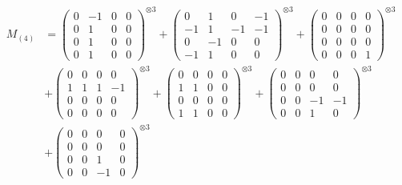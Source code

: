 \documentclass{article}
\newcommand{\Mthree}{%
    M_{(4)}
}
\begin{document}
        \newpage
        
        \footnotesize{
        \begin{align}
        \Mthree
        &= \label{Rs16-Rc11-Solution-32-c1} \begin{pmatrix} 0 & -1 & 0 & 0 \\ 0 & 1 & 0 & 0 \\ 0 & 1 & 0 & 0 \\ 0 & 1 & 0 & 0 \end{pmatrix}^{\otimes 3} 
            + \begin{pmatrix} 0 & 1 & 0 & -1 \\ -1 & 1 & -1 & -1 \\ 0 & -1 & 0 & 0 \\ -1 & 1 & 0 & 0 \end{pmatrix}^{\otimes 3} 
            + \begin{pmatrix} 0 & 0 & 0 & 0 \\ 0 & 0 & 0 & 0 \\ 0 & 0 & 0 & 0 \\ 0 & 0 & 0 & 1 \end{pmatrix}^{\otimes 3} \\
        &+ \label{Rs16-Rc11-Solution-32-c4} \begin{pmatrix} 0 & 0 & 0 & 0 \\ 1 & 1 & 1 & -1 \\ 0 & 0 & 0 & 0 \\ 0 & 0 & 0 & 0 \end{pmatrix}^{\otimes 3} 
            + \begin{pmatrix} 0 & 0 & 0 & 0 \\ 1 & 1 & 0 & 0 \\ 0 & 0 & 0 & 0 \\ 1 & 1 & 0 & 0 \end{pmatrix}^{\otimes 3} 
            + \begin{pmatrix} 0 & 0 & 0 & 0 \\ 0 & 0 & 0 & 0 \\ 0 & 0 & -1 & -1 \\ 0 & 0 & 1 & 0 \end{pmatrix}^{\otimes 3} \\
        &+ \label{Rs16-Rc11-Solution-32-c7} \begin{pmatrix} 0 & 0 & 0 & 0 \\ 0 & 0 & 0 & 0 \\ 0 & 0 & 1 & 0 \\ 0 & 0 & -1 & 0 \end{pmatrix}^{\otimes 3} 

\end{align}}
\end{document}
